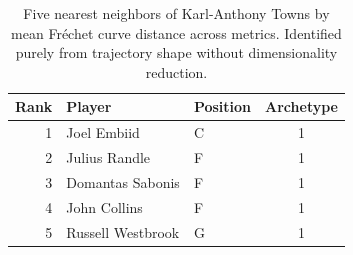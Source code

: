 \begin{table}[htbp]
  \centering\small
  \begin{tabular}{rllc}
    \toprule
    Rank & Player & Position & Archetype \\
    \midrule
    1 & Joel Embiid & C & 1 \\
    2 & Julius Randle & F & 1 \\
    3 & Domantas Sabonis & F & 1 \\
    4 & John Collins & F & 1 \\
    5 & Russell Westbrook & G & 1 \\
    \bottomrule
  \end{tabular}
  \caption{Five nearest neighbors of Karl-Anthony Towns by mean Fr\'{e}chet curve distance across metrics. Identified purely from trajectory shape without dimensionality reduction.}
  \label{tab:Karl_Anthony_Towns_frechet_curve_neighbors}
\end{table}

